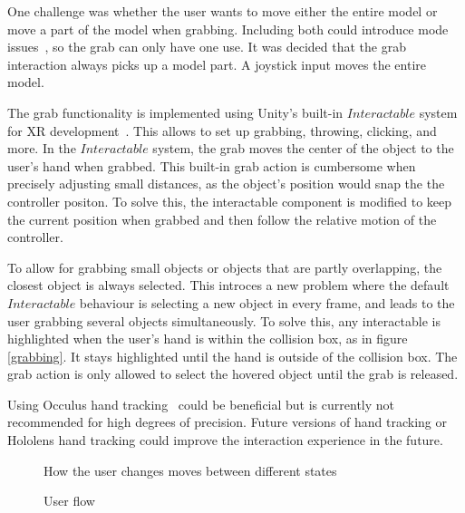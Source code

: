 \documentclass[a4paper]{report}
\begin{document}
One challenge was whether the user wants to move either the entire model or move a part of the model when grabbing. Including both could introduce mode issues~\cite{experience_modes_nodate}, so the grab can only have one use.
It was decided that the grab interaction always picks up a model part. A joystick input moves the entire model.

The grab functionality is implemented using Unity's built-in $Interactable$ system for XR development~\cite{noauthor_xr_nodate}. This allows to set up grabbing, throwing, clicking, and more.
In the $Interactable$ system, the grab moves the center of the object to the user's hand when grabbed. This built-in grab action is cumbersome when precisely adjusting small distances,
as the object's position would snap the the controller positon.
To solve this, the interactable component is modified to keep the current position when grabbed and then follow the relative motion of the controller.

To allow for grabbing small objects or objects that are partly overlapping, the closest object is always selected.
This introces a new problem where the default $Interactable$ behaviour is selecting a new object in every frame, and leads to the user grabbing several objects simultaneously. To solve this, any interactable is highlighted when the user's hand is within the collision box, as in figure \ref{grabbing}. It stays highlighted until the hand is outside of the collision box. The grab action is only allowed to select the hovered object until the grab is released.

Using Occulus hand tracking~\cite{noauthor_set_nodate} could be beneficial but is currently not recommended for high degrees of precision. Future versions of hand tracking or Hololens hand tracking could improve the interaction experience in the future.


\begin{figure}[h!]
    \centering
	\hfill
	\caption{User flow}\label{flow}
  \small
  How the user changes moves between different states
\end{figure}
\end{document}
